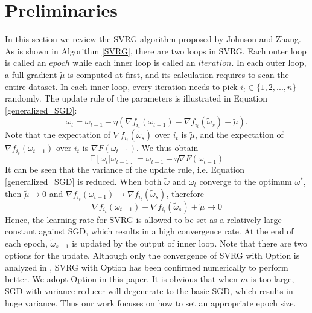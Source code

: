 \documentclass[conference]{IEEEtran}
\begin{document}
\section{Preliminaries}
\label{svrg_review}
 In this section we review the SVRG algorithm proposed by Johnson and Zhang\citep{Johnson:9MAvkbgy}.  As is shown in Algorithm \ref{SVRG}, there are two loops in SVRG. Each outer loop is called an $epoch$ while each inner loop is called an $iteration$. In each outer loop, a full gradient $\tilde{\mu}$ is computed at first, and its calculation requires to scan the entire dataset. In each inner loop,  every iteration needs to pick $i_t\in\{1, 2, ..., n\}$ randomly. The update rule of the parameters is illustrated in Equation \ref{generalized_SGD}:
\begin{equation}
\label{generalized_SGD}
\omega_t = \omega_{t-1} - \eta(\nabla f_{i_t}(\omega_{t-1}) - \nabla f_{i_t}(\tilde{\omega}_s)+\tilde{\mu}).
\end{equation}
Note that the expectation of $\nabla f_{i_t}(\tilde{\omega}_s)$ over $i_t$ is $\tilde{\mu}$, and the expectation of $\nabla f_{i_t}(\omega_{t-1})$ over $i_t$ is $\nabla F(\omega_{t-1})$. We thus obtain
\begin{equation}
\mathbb{E}[\omega_{t} | \omega_{t-1}] = \omega_{t-1} - \eta\nabla F(\omega_{t-1})
\end{equation}
 It can be seen that the variance of the update rule, i.e. Equation \ref{generalized_SGD} is reduced. When both $\tilde{\omega}$ and $\omega_t$ converge to the optimum $\omega^*$, then $\tilde{\mu}\rightarrow0$ and $\nabla f_{i_t}(\omega_{t-1})\rightarrow\nabla f_{i_t}(\tilde{\omega}_s)$, therefore
 $$\nabla f_{i_t}(\omega_{t-1}) - \nabla f_{i_t}(\tilde{\omega}_s)+\tilde{\mu}\rightarrow0$$
 Hence, the learning rate for SVRG is allowed to be set as a relatively large constant against SGD, which results in a high convergence rate.
At the end of each epoch, $\tilde\omega_{s+1}$ is updated by the output of inner loop. Note that there are two options for the update. Although only the convergence of SVRG with Option \uppercase\expandafter{} is analyzed in \citep{Johnson:9MAvkbgy}, SVRG with Option \uppercase\expandafter{} has been confirmed numerically to perform better. We adopt Option \uppercase\expandafter{} in this paper. It is obvious that when $m$ is too large, SGD with variance reducer will degenerate to the basic SGD, which results in huge variance. Thus our work focuses on how to set an appropriate epoch size.
 
\end{document}
